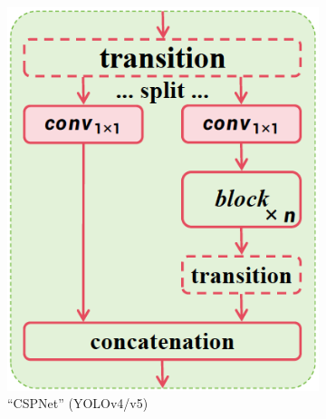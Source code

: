 \begin{figure}[H]
    \centering
    \begin{subfigure}[b]{0.30\textwidth}
        \centering
        \includegraphics[width=\textwidth]{02-main/figures/ch2/ch2_yolo_06_architecture_csp.png}
        \caption{``CSPNet'' (YOLOv4/v5)}
        \label{fig:ch2_yolo_06_architecture_csp}
    \end{subfigure}
    \hfill
    \begin{subfigure}[b]{0.30\textwidth}
        \centering

\end{subfigure}
\end{figure}
